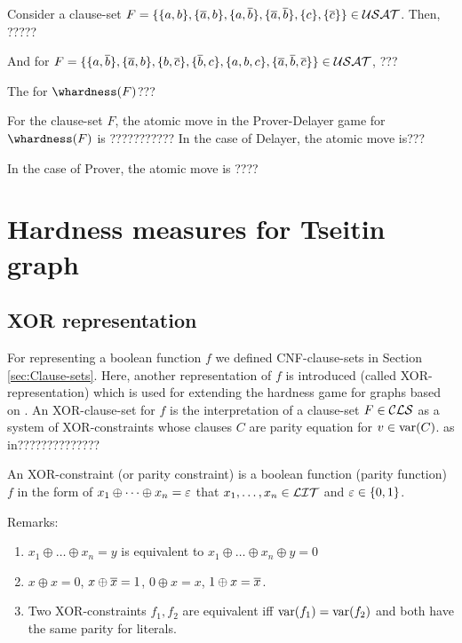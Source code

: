 \documentclass{report}
\begin{document}
\begin{examp}\label{exp:gamehd}
Consider a clause-set $F=\{ \{ a,b \},\{ \overline a,b \},\{ a,\overline b \},\{ \overline a,\overline b \},\{ c \},\{ \overline c \} \} \in \mathcal{USAT}$. Then, ?????

And for $F=\{ \{ a,\overline{b} \},\{ \overline{a},b \},\{ b,\overline{c} \},\{ \overline{b},c \},\{ a,b,c \},\{ \overline{a},\overline{b},\overline{c} \} \} \in \mathcal{USAT}$, ???
\end{examp}

The for $\whardness(F)$???

\begin{defi}\label{def:atomic-move}
For the clause-set $F$, the atomic move in the Prover-Delayer game for $\whardness(F)$ is ???????????
In the case of Delayer, the atomic move is???

In the case of Prover, the atomic move is ????
\end{defi}
\chapter{Hardness measures for Tseitin graph}
\label{cha:hdgame}

\section{XOR representation}
\label{sec:XOR representation}
For representing a boolean function $f$ we defined CNF-clause-sets in Section \ref{sec:Clause-sets}. Here, another representation of $f$ is introduced (called XOR-representation) which is used for extending the hardness game for graphs based on \cite{h8,h23}. An XOR-clause-set for $f$ is the interpretation of a clause-set $F \in \mathcal{CLS}$ as a system of XOR-constraints whose clauses $C$ are parity equation for $v \in \operatorname{var}(C)$. 
as in??????????????
\begin{defi}\label{def:xor-const} 
An XOR-constraint (or parity constraint) is a boolean function (parity function) $f$ in the form of $x_1 \oplus \dots \oplus x_n = \varepsilon$ that $x_1, \dots, x_n \in \mathcal{LIT}$ and $\varepsilon \in \{ 0,1 \}$.
\end{defi}

Remarks:
\begin{enumerate}
    \item $x_1 \oplus \dots \oplus x_n = y$ is equivalent to $x_1 \oplus \dots \oplus x_n \oplus y = 0$
    \item $x \oplus x = 0$, $x \oplus \overline{x} = 1$, $0 \oplus x = x$, $1 \oplus x = \overline{x}$.
    \item Two XOR-constraints $f_1, f_2$ are equivalent iff $\operatorname{var}(f_1) = \operatorname{var}(f_2)$ and both have the same parity for literals.
\end{enumerate}
\end{document}

